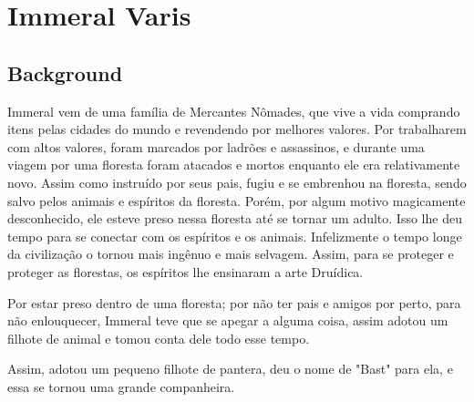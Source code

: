 \documentclass[a4paper,12p]{book}
\begin{document}
	
	
	
	\setcounter{page}{1}
	
	
	\chapter{Immeral Varis}
	\section{Background}
	
	Immeral vem de uma família de Mercantes Nômades, que vive a vida comprando itens pelas cidades do mundo e revendendo por melhores valores. Por trabalharem com altos valores, foram marcados por ladrões e assassinos, e durante uma viagem por uma floresta foram atacados e mortos enquanto ele era relativamente novo. Assim como instruído por seus pais, fugiu e se embrenhou na floresta, sendo salvo pelos animais e espíritos da floresta. Porém, por algum motivo magicamente desconhecido, ele esteve preso nessa floresta até se tornar um adulto. Isso lhe deu tempo para se conectar com os espíritos e os animais. Infelizmente o tempo longe da civilização o tornou mais ingênuo e mais selvagem. Assim, para se proteger e proteger as florestas, os espíritos lhe ensinaram a arte Druídica.
	
	Por estar preso dentro de uma floresta; por não ter pais e amigos por perto, para não enlouquecer, Immeral teve que se apegar a alguma coisa, assim adotou um filhote de animal e tomou conta dele todo esse tempo.
	
	Assim, adotou um pequeno filhote de pantera, deu o nome de "Bast" para ela, e essa se tornou uma grande companheira.
	
\end{document}
